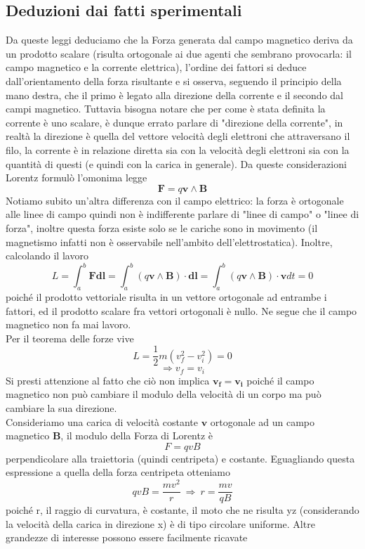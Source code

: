 \documentclass[10pt,a4paper]{article}
\begin{document}
\subsection{Deduzioni dai fatti sperimentali}
Da queste leggi deduciamo che la Forza generata dal campo magnetico deriva da un prodotto scalare (risulta ortogonale ai due agenti che sembrano provocarla: il campo magnetico e la corrente elettrica), l'ordine dei fattori si deduce dall'orientamento della forza risultante e si osserva, seguendo il principio della mano destra, che il primo è legato alla direzione della corrente e il secondo dal campi magnetico. Tuttavia bisogna notare che per come è stata definita la corrente è uno scalare, è dunque errato parlare di "direzione della corrente", in realtà la direzione è quella del vettore velocità degli elettroni che attraversano il filo, la corrente è in relazione diretta sia con la velocità degli elettroni sia con la quantità di questi (e quindi con la carica in generale). Da queste considerazioni Lorentz formulò l'omonima legge
\[\mathbf{F}=q\mathbf{v}\wedge\mathbf{B}\]
Notiamo subito un'altra differenza con il campo elettrico: la forza è ortogonale alle linee di campo quindi non è indifferente parlare di "linee di campo" o "linee di forza", inoltre questa forza esiste solo se le cariche sono in movimento (il magnetismo infatti non è osservabile nell'ambito dell'elettrostatica). Inoltre, calcolando il lavoro
\[L = \int_a^b \mathbf{F}\mathbf{dl}=\int_a^b (q\mathbf{v}\wedge\mathbf{B})\cdot \mathbf{dl}= \int_a^b (q\mathbf{v}\wedge\mathbf{B})\cdot \mathbf{v}dt= 0 \]
poiché il prodotto vettoriale risulta in un vettore ortogonale ad entrambe i fattori, ed il prodotto scalare fra vettori ortogonali è nullo. Ne segue che il campo magnetico non fa mai lavoro.\\
Per il teorema delle forze vive 
\[L = \frac{1}{2}m(v_f^2-v_i^2) = 0 \]
\[\Rightarrow v_f = v_i\]
Si presti attenzione al fatto che ciò non implica \(\mathbf{v_f} = \mathbf{v_i}\) poiché il campo magnetico non può cambiare il modulo della velocità di un corpo ma può cambiare la sua direzione.\\
Consideriamo una carica di velocità costante $\mathbf{v}$ ortogonale ad un campo magnetico $\mathbf{B}$, il modulo della Forza di Lorentz è
\[F = qvB\]
perpendicolare alla traiettoria (quindi centripeta) e costante. Eguagliando questa espressione a quella della forza centripeta otteniamo
\[qvB=\frac{mv^2}{r}\ \Rightarrow\ r=\frac{mv}{qB}\]
poiché r, il raggio di curvatura, è costante, il moto che ne risulta yz (considerando la velocità della carica in direzione x) è di tipo circolare uniforme. Altre grandezze di interesse possono essere facilmente ricavate
\end{document}

